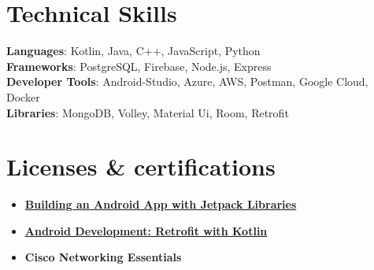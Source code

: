 \documentclass[letterpaper,11pt]{article}
\newcommand{\resumeItem}[1]{
  \item\small{
    {#1 \vspace{-2pt}}
  }
}
\newcommand{\resumeItemListStart}{\begin{itemize}}
\newcommand{\resumeItemListEnd}{\end{itemize}\vspace{-5pt}}
\begin{document}
\section{\textbf{Technical Skills}}
 \begin{itemize}[leftmargin=0.15in, label={}]
    \small{\item{
     \textbf{Languages}{: Kotlin, Java, C++, JavaScript, Python} \\
     \textbf{Frameworks}{: PostgreSQL, Firebase, Node.js, Express  } \\
     \textbf{Developer Tools}{: Android-Studio, Azure, AWS, Postman, Google Cloud, Docker } \\
     \textbf{Libraries}{: MongoDB, Volley, Material Ui, Room, Retrofit  }
    }} 
 \end{itemize}
   
\section{\textbf{Licenses \& certifications}}
 \begin{itemize}[leftmargin=0.15in, label={}]
    \small{\item{
        \resumeItemListStart
                \resumeItem{\textbf{\href{https://www.linkedin.com/learning/certificates/0678a1527860b8e6ba5694ca1c73c5bab5c3463b8bb5d6c3b9a1fcc19be38ce9}{Building an Android App with Jetpack Libraries}}}
                \resumeItem{\textbf{\href{https://www.linkedin.com/learning/certificates/0f804705fc3f345406c7a7ccdc10ec244d4384268e86e94bc5eafd52f67755d0}{Android Development: Retrofit with Kotlin}}} 

                \resumeItem{\textbf{{Cisco Networking Essentials}}}
                \newline
      \resumeItemListEnd
    }}
 \end{itemize}
    
\end{document}
